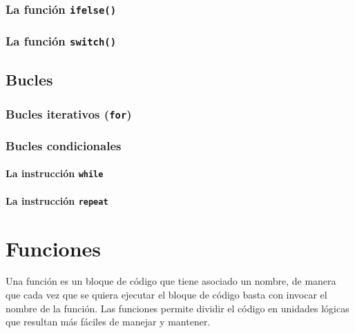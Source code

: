 \documentclass[
]{book}
\theoremstyle{definition}
\theoremstyle{definition}
\theoremstyle{definition}
\theoremstyle{definition}
\theoremstyle{remark}
\begin{document}
\hypertarget{la-funciuxf3n-ifelse}{%
\subsection{\texorpdfstring{La función \texttt{ifelse()}}{La función ifelse()}}\label{la-funciuxf3n-ifelse}}

\hypertarget{la-funciuxf3n-switch}{%
\subsection{\texorpdfstring{La función \texttt{switch()}}{La función switch()}}\label{la-funciuxf3n-switch}}

\hypertarget{bucles}{%
\section{Bucles}\label{bucles}}

\hypertarget{bucles-iterativos-for}{%
\subsection{\texorpdfstring{Bucles iterativos (\texttt{for})}{Bucles iterativos (for)}}\label{bucles-iterativos-for}}

\hypertarget{bucles-condicionales}{%
\subsection{Bucles condicionales}\label{bucles-condicionales}}

\hypertarget{la-instrucciuxf3n-while}{%
\subsubsection{\texorpdfstring{La instrucción \texttt{while}}{La instrucción while}}\label{la-instrucciuxf3n-while}}

\hypertarget{la-instrucciuxf3n-repeat}{%
\subsubsection{\texorpdfstring{La instrucción \texttt{repeat}}{La instrucción repeat}}\label{la-instrucciuxf3n-repeat}}

\hypertarget{funciones}{%
\chapter{Funciones}\label{funciones}}

Una función es un bloque de código que tiene asociado un nombre, de manera que cada vez que se quiera ejecutar el bloque de código basta con invocar el nombre de la función. Las funciones permite dividir el código en unidades lógicas que resultan más fáciles de manejar y mantener.
\end{document}
